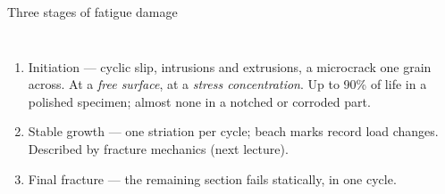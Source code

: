 \documentclass[aspectratio=169,10pt]{beamer}
\begin{document}
\begin{frame}{Three stages of fatigue damage}
\footnotesize
\begin{columns}[T]
\begin{enumerate}
  \item \alert{Initiation} --- cyclic slip, intrusions and extrusions, a microcrack one grain across. At a \emph{free surface}, at a \emph{stress concentration}. Up to 90\% of life in a polished specimen; almost none in a notched or corroded part.
  \item \alert{Stable growth} --- one striation per cycle; beach marks record load changes. Described by fracture mechanics (next lecture).
  \item \alert{Final fracture} --- the remaining section fails statically, in one cycle.
\end{enumerate}
\centering
{}
\end{columns}
\end{frame}
\end{document}
